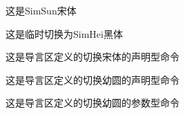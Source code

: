 \documentclass{article}
\newcommand{\youyuan}[1]{\youyuandecl#1} %
\begin{document}
这是SimSun宋体

这是临时切换为SimHei黑体

\SwitchToSong
这是导言区定义的切换宋体的声明型命令

{\youyuandecl 这是导言区定义的切换幼圆的声明型命令}

\youyuan{这是导言区定义的切换幼圆的参数型命令}


\end{document}
